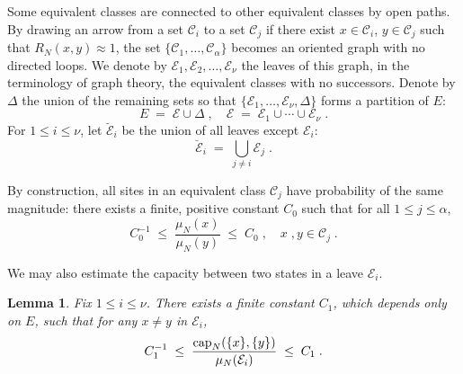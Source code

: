 \documentclass[reqno]{amsart}
\newtheorem{lemma}[theorem]{Lemma}
\begin{document}
Some equivalent classes are connected to other equivalent classes by
open paths. By drawing an arrow from a set ${{\mathcal C}}_i$ to a set ${{\mathcal C}}_j$ if there exist $x\in{{\mathcal C}}_i$, $y\in {{\mathcal C}}_j$ such that $R_N(x,
y)\approx 1$, the set $\{{{\mathcal C}}_1, \dots, {{\mathcal C}}_{\alpha}\}$ becomes an
oriented graph with no directed loops. We denote by ${{\mathcal E}}_1, {{\mathcal E}}_2,
\dots, {{\mathcal E}}_{\nu}$ the leaves of this graph, in the terminology of
graph theory, the equivalent classes with no successors. Denote by
$\Delta$ the union of the remaining sets so that $\{{{\mathcal E}}_1, \dots,
{{\mathcal E}}_{\nu}, \Delta\}$ forms a partition of $E$:
\begin{equation}
\label{17}
E \;=\; {{\mathcal E}} \cup \Delta \;, \quad
{{\mathcal E}} \;=\; {{\mathcal E}}_1 \cup  \cdots \cup {{\mathcal E}}_{\nu}
\; .
\end{equation}
For $1\le i\le \nu$, let $\breve{{{\mathcal E}}}_i$ be the union of all leaves
except ${{\mathcal E}}_i$:
\begin{equation*}
\breve{{{\mathcal E}}}_i \;=\; \bigcup_{j\not = i} {{{\mathcal E}}}_j\;.
\end{equation*}

By construction, all sites in an equivalent class ${{\mathcal C}}_j$ have
probability of the same magnitude: there exists a finite, positive
constant $C_0$ such that for all $1\le j\le \alpha$,
\begin{equation}
\label{f01}
C_0^{-1} \;\le\; \frac{\mu_N(x)}{\mu_N(y)} \;\le\; C_0\;, \quad x\;, y
\in {{\mathcal C}}_j\;.
\end{equation}

We may also estimate the capacity between two states in a leave ${{\mathcal E}}_i$. 

\begin{lemma}
\label{s01}
Fix $1\le i\le \nu$.  There exists a finite constant $C_1$, which
depends only on $E$, such that for any $x\not = y$ in ${{\mathcal E}}_i$,
\begin{equation*}
C_1^{-1}  \;\le\; \frac{{{\rm cap}}_N(\{x\}, \{y\})}{\mu_N({{\mathcal E}}_i)}
\;\le\; C_1 \;.
\end{equation*}
\end{lemma}
\end{document}
